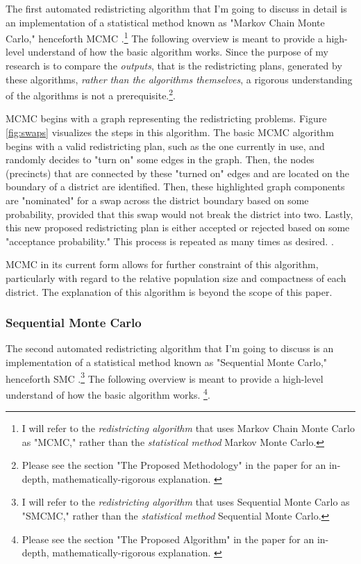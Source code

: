 The first automated redistricting algorithm that I'm going to discuss in detail is an implementation of a statistical method known as "Markov Chain Monte Carlo," henceforth MCMC \parencite{fifield2020}.\footnote{I will refer to the \emph{redistricting algorithm} that uses Markov Chain Monte Carlo as "MCMC," rather than the \emph{statistical method} Markov Monte Carlo.} The following overview is meant to provide a high-level understand of how the basic algorithm works. Since the purpose of my research is to compare the \emph{outputs}, that is the redistricting plans, generated by these algorithms, \emph{rather than the algorithms themselves}, a rigorous understanding of the algorithms is not a prerequisite.\footnote{Please see the section "The Proposed Methodology" in the paper for an in-depth, mathematically-rigorous explanation. \parencite[2]{fifield2020}}.

MCMC begins with a graph representing the redistricting problems. Figure \ref{fig:swaps} visualizes the steps in this algorithm. The basic MCMC algorithm begins with a valid redistricting plan, such as the one currently in use, and randomly decides to "turn on" some edges in the graph. Then, the nodes (precincts) that are connected by these "turned on" edges and are located on the boundary of a district are identified. Then, these highlighted graph components are "nominated" for a swap across the district boundary based on some probability, provided that this swap would not break the district into two. Lastly, this new proposed redistricting plan is either accepted or rejected based on some "acceptance probability." This process is repeated as many times as desired. \parencite{fifield2020}.

MCMC in its current form allows for further constraint of this algorithm, particularly with regard to the relative population size and compactness of each district. \parencite[6]{fifield2020} The explanation of this algorithm is beyond the scope of this paper. 

\subsubsection{Sequential Monte Carlo}
\label{sec:smc}

The second automated redistricting algorithm that I'm going to discuss is an implementation of a statistical method known as "Sequential Monte Carlo," henceforth SMC \parencite{mccartan2020}.\footnote{I will refer to the \emph{redistricting algorithm} that uses Sequential Monte Carlo as "SMCMC," rather than the \emph{statistical method} Sequential Monte Carlo.} The following overview is meant to provide a high-level understand of how the basic algorithm works. \footnote{Please see the section "The Proposed Algorithm" in the paper for an in-depth, mathematically-rigorous explanation. \parencite[13]{mccartan2020}}.

